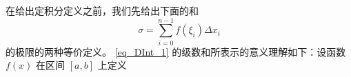 
在给出定积分定义之前，我们先给出下面的和
\begin{equation}\label{eq_DInt_1}
\sigma=\sum_{i=0}^{n-1}f(\xi_i)\Delta x_i
\end{equation}
的极限的两种等价定义。
\autoref{eq_DInt_1} 的级数和所表示的意义理解如下：设函数 $f(x)$ 在区间 $[a,b]$ 上定义